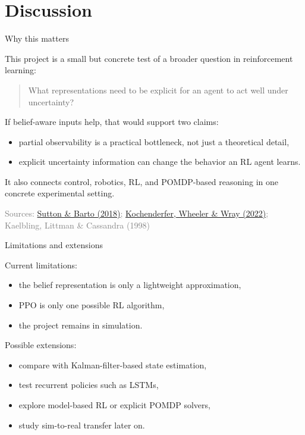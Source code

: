 \documentclass[11pt]{beamer}
\newcommand{\srcSuttonBarto}{\href{http://incompleteideas.net/book/the-book.html}{Sutton \& Barto (2018)}}
\newcommand{\srcKochenderferADM}{\href{https://algorithmsbook.com}{Kochenderfer, Wheeler \& Wray (2022)}}
\newcommand{\srcKaelbling}{Kaelbling, Littman \& Cassandra (1998)}
\newcommand{\SourceLine}[1]{\vfill{\tiny\textcolor{gray}{Sources: #1}}}
\begin{document}

\section{Discussion}


\begin{frame}{Why this matters}

This project is a small but concrete test of a broader question in reinforcement learning:

\medskip
\begin{quote}
What representations need to be explicit for an agent to act well under uncertainty?
\end{quote}

\medskip
If belief-aware inputs help, that would support two claims:
\begin{itemize}
  \item partial observability is a practical bottleneck, not just a theoretical detail,
  \item explicit uncertainty information can change the behavior an RL agent learns.
\end{itemize}

It also connects control, robotics, RL, and POMDP-based reasoning in one concrete experimental setting.

\SourceLine{\srcSuttonBarto; \srcKochenderferADM; \srcKaelbling}
\end{frame}


\begin{frame}{Limitations and extensions}

Current limitations:
\begin{itemize}
  \item the belief representation is only a lightweight approximation,
  \item PPO is only one possible RL algorithm,
  \item the project remains in simulation.
\end{itemize}

\medskip
Possible extensions:
\begin{itemize}
  \item compare with Kalman-filter-based state estimation,
  \item test recurrent policies such as LSTMs,
  \item explore model-based RL or explicit POMDP solvers,
  \item study sim-to-real transfer later on.
\end{itemize}
\end{frame}
\end{document}
